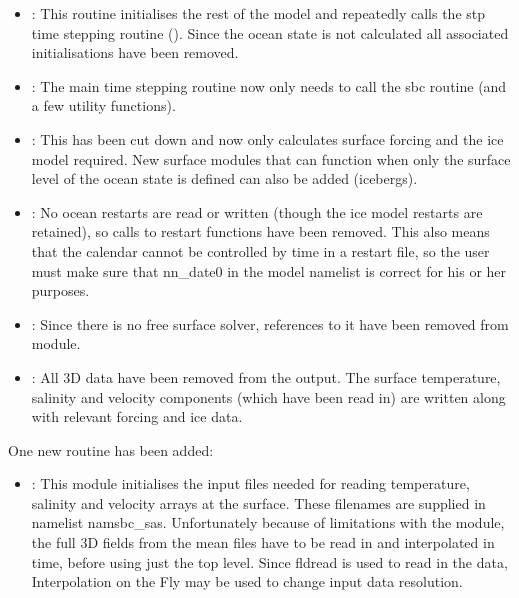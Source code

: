 \documentclass[../main/NEMO_manual]{subfiles}
\begin{document}
\begin{itemize}
\item
  :
  This routine initialises the rest of the model and repeatedly calls the stp time stepping routine ().
  Since the ocean state is not calculated all associated initialisations have been removed.
\item
  :
  The main time stepping routine now only needs to call the sbc routine (and a few utility functions).
\item
  :
  This has been cut down and now only calculates surface forcing and the ice model required.
  New surface modules that can function when only the surface level of the ocean state is defined can also be added
  (\eg icebergs).
\item
  :
  No ocean restarts are read or written (though the ice model restarts are retained),
  so calls to restart functions have been removed.
  This also means that the calendar cannot be controlled by time in a restart file,
  so the user must make sure that nn{\_}date0 in the model namelist is correct for his or her purposes.
\item
  :
  Since there is no free surface solver, references to it have been removed from  module.
\item
  :
  All 3D data have been removed from the output.
  The surface temperature, salinity and velocity components (which have been read in) are written along with
  relevant forcing and ice data.
\end{itemize}

One new routine has been added:

\begin{itemize}
\item
  :
  This module initialises the input files needed for reading temperature, salinity and
  velocity arrays at the surface.
  These filenames are supplied in namelist namsbc{\_}sas.
  Unfortunately because of limitations with the  module,
  the full 3D fields from the mean files have to be read in and interpolated in time,
  before using just the top level.
  Since fldread is used to read in the data, Interpolation on the Fly may be used to change input data resolution.
\end{itemize}


\end{document}
